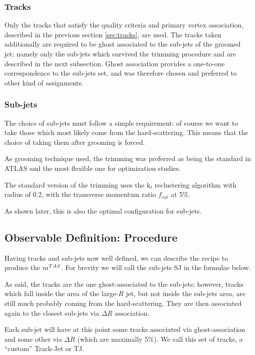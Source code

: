 \subsubsection{Tracks}
Only the tracks that satisfy the quality criteria and primary vertex association, described in the previous section \ref{sec:tracks}, are used.
The tracks taken additionally are required to be ghost associated to the sub-jets of the groomed jet; namely only the sub-jets which survived the trimming procedure and are described in the next subsection.
Ghost association provides a one-to-one correspondence to the sub-jets set, and was therefore chosen and preferred to other kind of assignments.

\subsubsection{Sub-jets}

The choice of sub-jets must follow a simple requirement: of course we want to take those which most likely come from the hard-scattering. This means that the choice of taking them after grooming is forced.

As grooming technique used, the trimming was preferred as being the standard in ATLAS and the most flexible one for optimization studies.

The standard version of the trimming uses the k$_t$ reclustering algorithm with radius of 0.2, with the transverse momentum ratio $f_{cut}$ at 5\%.

As shown later, this is also the optimal configuration for sub-jets.

\subsection{Observable Definition: Procedure}\label{subsec:ObsDef_Proc}
Having tracks and sub-jets now well defined, we can describe the recipe to produce the $m^{TAS}$. For brevity we will call the sub-jets SJ in the formulae below. 

As said, the tracks are the one ghost-associated to the sub-jets; however, tracks which fall inside the area of the large-$R$ jet, but not inside the sub-jets area, are still much probably coming from the hard-scattering. They are then associated again to the closest sub-jets via $\Delta R$ association.

Each sub-jet will have at this point some tracks associated via ghost-association and some other via $\Delta R$ (which are maximally 5\%). We call this set of tracks, a ``custom'' Track-Jet or TJ.

